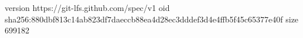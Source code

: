 version https://git-lfs.github.com/spec/v1
oid sha256:880dbf813c14ab823df7daeccb88ea4d28ec3dddef3d4e4ffb5f45c65377e40f
size 699182
